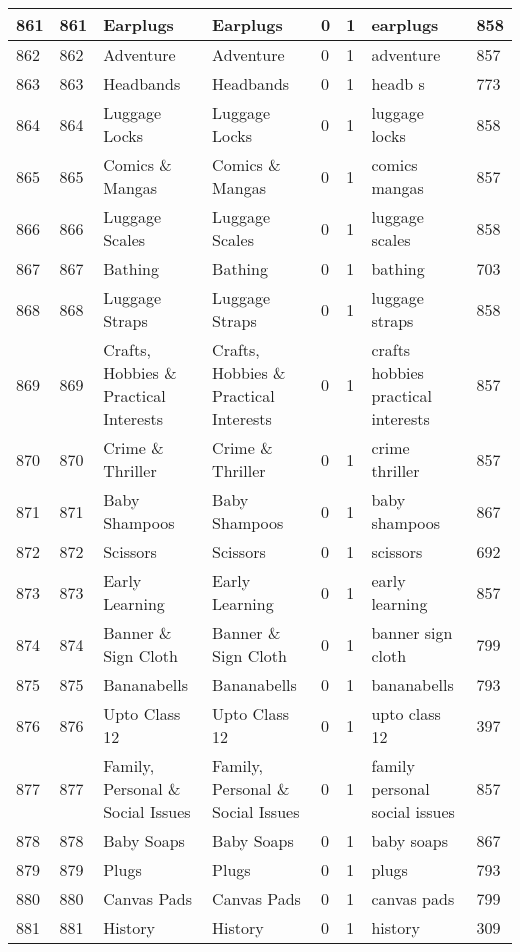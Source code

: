 \begin{longtable}{|l|l|l|l|l|l|l|l|}
861 & 861 & Earplugs & Earplugs & 0 & 1 & earplugs & 858 \\ \hline 
862 & 862 & Adventure & Adventure & 0 & 1 & adventure & 857 \\ \hline 
863 & 863 & Headbands & Headbands & 0 & 1 & headb s & 773 \\ \hline 
864 & 864 & Luggage Locks & Luggage Locks & 0 & 1 & luggage locks & 858 \\ \hline 
865 & 865 & Comics \& Mangas & Comics \& Mangas & 0 & 1 & comics mangas & 857 \\ \hline 
866 & 866 & Luggage Scales & Luggage Scales & 0 & 1 & luggage scales & 858 \\ \hline 
867 & 867 & Bathing & Bathing & 0 & 1 & bathing & 703 \\ \hline 
868 & 868 & Luggage Straps & Luggage Straps & 0 & 1 & luggage straps & 858 \\ \hline 
869 & 869 & Crafts, Hobbies \& Practical Interests & Crafts, Hobbies \& Practical Interests & 0 & 1 & crafts hobbies practical interests & 857 \\ \hline 
870 & 870 & Crime \& Thriller & Crime \& Thriller & 0 & 1 & crime thriller & 857 \\ \hline 
871 & 871 & Baby Shampoos & Baby Shampoos & 0 & 1 & baby shampoos & 867 \\ \hline 
872 & 872 & Scissors & Scissors & 0 & 1 & scissors & 692 \\ \hline 
873 & 873 & Early Learning & Early Learning & 0 & 1 & early learning & 857 \\ \hline 
874 & 874 & Banner \& Sign Cloth & Banner \& Sign Cloth & 0 & 1 & banner sign cloth & 799 \\ \hline 
875 & 875 & Bananabells & Bananabells & 0 & 1 & bananabells & 793 \\ \hline 
876 & 876 & Upto Class 12 & Upto Class 12 & 0 & 1 & upto class 12 & 397 \\ \hline 
877 & 877 & Family, Personal \& Social Issues & Family, Personal \& Social Issues & 0 & 1 & family personal social issues & 857 \\ \hline 
878 & 878 & Baby Soaps & Baby Soaps & 0 & 1 & baby soaps & 867 \\ \hline 
879 & 879 & Plugs & Plugs & 0 & 1 & plugs & 793 \\ \hline 
880 & 880 & Canvas Pads & Canvas Pads & 0 & 1 & canvas pads & 799 \\ \hline 
881 & 881 & History & History & 0 & 1 & history & 309 \\ \hline 

\end{longtable}
